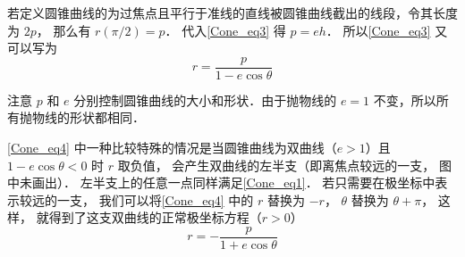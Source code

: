若定义圆锥曲线的为过焦点且平行于准线的直线被圆锥曲线截出的线段，令其长度为 $2p$， 那么有 $r(\pi /2) = p$． 代入\autoref{Cone_eq3} 得 $p = eh$． 所以\autoref{Cone_eq3} 又可以写为
\begin{equation}\label{Cone_eq4}
r  = \frac{p}{1 - e\cos \theta }
\end{equation}


注意 $p$ 和 $e$ 分别控制圆锥曲线的大小和形状．由于抛物线的 $e = 1$ 不变，所以所有抛物线的形状都相同．

\autoref{Cone_eq4} 中一种比较特殊的情况是当圆锥曲线为双曲线（$e > 1$）且 $1- e\cos\theta < 0$ 时 $r$ 取负值， 会产生双曲线的左半支（即离焦点较远的一支， 图中未画出）． 左半支上的任意一点同样满足\autoref{Cone_eq1}． 若只需要在极坐标中表示较远的一支， 我们可以将\autoref{Cone_eq4} 中的 $r$ 替换为 $-r$， $\theta$ 替换为 $\theta + \pi$， 这样， 就得到了这支双曲线的正常极坐标方程（$r > 0$）
\begin{equation}\label{Cone_eq6}
r = -\frac{p}{1 + e\cos\theta}
\end{equation}



